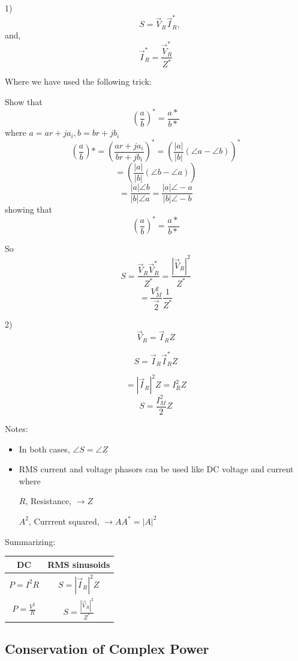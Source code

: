 1)
\[
 \quad S = \vec{V}_R \vec{I}_R^*,
\]
and,
\[
\vec{I}_R^* = \frac{\vec{V}_R^*}{Z^*}
\]

\begin{ExampleSmall}
Where we have used the following trick:

\noindent
Show that
\[
\left (\frac {a}  {b}\right )^*  =  \frac {a*}  {b*}
\]
where $a = ar+ja_i, b = br+jb_i$
\[
\left (\frac {a}  {b}\right )*  =  \left (\frac {ar+j a_i}  {br+jb_i} \right )^* =
\left (\frac {|a|}  {|b|} (\angle a - \angle b) \right )^*
\]
\[
= \left (\frac {|a|}  {|b|} (\angle b - \angle a) \right )
\]
\[
=\frac {|a|\angle b}  {|b|\angle a}
=\frac {|a|\angle -a}  {|b|\angle -b}
\]
showing that
\[
\left (\frac {a}  {b}\right )^*  =  \frac {a*}  {b*}
\]
\end{ExampleSmall}
\vspace{0.25in}

So
\[
S = \frac{\vec{V}_R \vec{V}_R^*}{Z^*} = \frac{|\vec{V}_R|^2}{Z^*}
\]
\[\boxed{
= \frac{V_M^2}{\vec{2}}\frac{1}{Z^*}
}
\]

2)
\[
\vec{V}_R = \vec{I}_R Z
\]

\[
S = \vec I_R \vec I_R^* Z
\]

\[
= |\vec{I}_R|^2 {Z} = I_R^2 {Z}
\]
\[
\boxed {
     S=  \frac{I_M^2}{2} {Z}
     }
\]

Notes:
\begin{itemize}
\item In both cases, $\angle S = \angle Z$

\item RMS current and voltage phasors can be used like DC voltage and current where

$R$, Resistance, $ \rightarrow Z$

$A^2$, Currrent squared, $ \rightarrow A A^* = |A|^2$
\end{itemize}

Summarizing:

\begin{center}
\begin{tabular}{c|c}
DC & RMS sinusoids \\
\hline
$P = I^2 R$ & $S = |\vec{I}_R|^2 Z$ \\
$P = \frac{V^2}{R}$ & $S = \frac{|\vec{V}_R|^2}{Z^*}$ \\
\end{tabular}
\end{center}





\subsection{Conservation of Complex Power}

